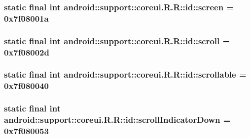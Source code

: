\hypertarget{classandroid_1_1support_1_1coreui_1_1_r_1_1id_3d89a06ee37d45f054192fb6bebf5a88}{
\subsubsection[{screen}]{\setlength{\rightskip}{0pt plus 5cm}static final int android::support::coreui.R.R::id::screen = 0x7f08001a}}
\label{classandroid_1_1support_1_1coreui_1_1_r_1_1id_3d89a06ee37d45f054192fb6bebf5a88}


\hypertarget{classandroid_1_1support_1_1coreui_1_1_r_1_1id_a220ffd030f7a1427d36c1fc6fee7dbd}{
\subsubsection[{scroll}]{\setlength{\rightskip}{0pt plus 5cm}static final int android::support::coreui.R.R::id::scroll = 0x7f08002d}}
\label{classandroid_1_1support_1_1coreui_1_1_r_1_1id_a220ffd030f7a1427d36c1fc6fee7dbd}


\hypertarget{classandroid_1_1support_1_1coreui_1_1_r_1_1id_568e0fb621a230a9791428f64cbcf62b}{
\subsubsection[{scrollable}]{\setlength{\rightskip}{0pt plus 5cm}static final int android::support::coreui.R.R::id::scrollable = 0x7f080040}}
\label{classandroid_1_1support_1_1coreui_1_1_r_1_1id_568e0fb621a230a9791428f64cbcf62b}


\hypertarget{classandroid_1_1support_1_1coreui_1_1_r_1_1id_a2297e812b38b7097d893f3009617440}{
\subsubsection[{scrollIndicatorDown}]{\setlength{\rightskip}{0pt plus 5cm}static final int android::support::coreui.R.R::id::scrollIndicatorDown = 0x7f080053}}
\label{classandroid_1_1support_1_1coreui_1_1_r_1_1id_a2297e812b38b7097d893f3009617440}


